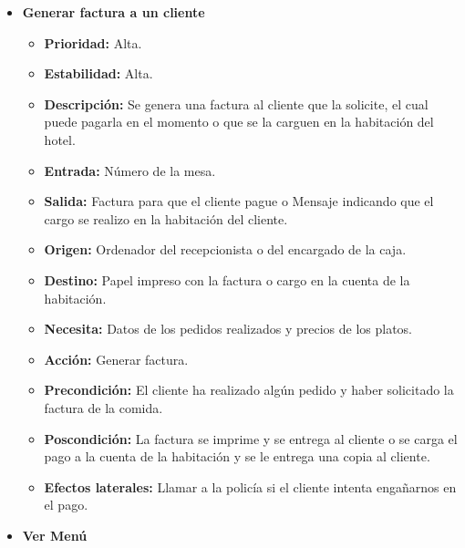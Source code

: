 \documentclass[spanish,a4paper,11pt, twoside]{report}	%
\begin{document}
\begin{itemize}
\begin{itemize}
		\end{itemize}%

	\item \textbf{Generar factura a un cliente} %

		\begin{itemize}
			\item \textbf{Prioridad: } Alta.
			\item \textbf{Estabilidad: } Alta.
			\item \textbf{Descripción: } Se genera una factura al cliente que la solicite, el cual puede pagarla en el momento o que se la carguen en la habitación del hotel.
			\item \textbf{Entrada: } Número de la mesa.
			\item \textbf{Salida: } Factura para que el cliente pague o Mensaje indicando que el cargo se realizo en la habitación del cliente.
			\item \textbf{Origen: } Ordenador del recepcionista o del encargado de la caja.
			\item \textbf{Destino: } Papel impreso con la factura o cargo en la cuenta de la habitación.
			\item \textbf{Necesita: } Datos de los pedidos realizados y precios de los platos.
			\item \textbf{Acción: } Generar factura.
			\item \textbf{Precondición: } El cliente ha realizado algún pedido y haber solicitado la factura de la comida.
			\item \textbf{Poscondición: } La factura se imprime y se entrega al cliente o se carga el pago a la cuenta de la habitación y se le entrega una copia al cliente.
			\item \textbf{Efectos laterales: } Llamar a la policía si el cliente intenta engañarnos en el pago.

		\end{itemize}%

	\item \textbf{Ver Menú} %


\end{itemize}
\end{document}
